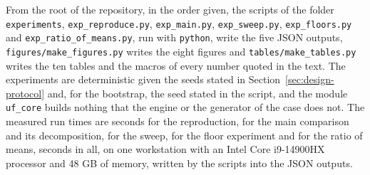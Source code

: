 From the root of the repository, in the order given, the scripts of the folder \texttt{experiments}, \texttt{exp\_reproduce.py}, \texttt{exp\_main.py}, \texttt{exp\_sweep.py}, \texttt{exp\_floors.py} and \texttt{exp\_ratio\_\allowbreak of\_means.py}, run with \texttt{python}, write the five JSON outputs, \texttt{figures/\allowbreak make\_figures.py} writes the eight figures and \texttt{tables/\allowbreak make\_tables.py} writes the ten tables and the macros of every number quoted in the text. The experiments are deterministic given the seeds stated in Section~\ref{sec:design-protocol} and, for the bootstrap, the seed stated in the script, and the module \texttt{uf\_core} builds nothing that the engine or the generator of the case does not. The measured run times are \repSeconds{} seconds for the reproduction, \mainSeconds{} for the main comparison and its decomposition, \sweepSeconds{} for the sweep, \floorsSeconds{} for the floor experiment and \ratioSeconds{} for the ratio of means, \totalSeconds{} seconds in all, on one workstation with an Intel Core i9-14900HX processor and 48 GB of memory, written by the scripts into the JSON outputs.
